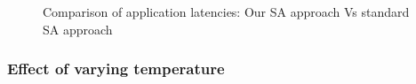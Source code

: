 \begin{figure}[t!]
{    \label{fig:jacl1random}
  }
  \caption{Comparison of application latencies: Our SA approach Vs
    standard SA approach}
  \label{fig:stdsa}
\end{figure}

\subsubsection{Effect of varying temperature}
\label{sec:varying-temperature}




